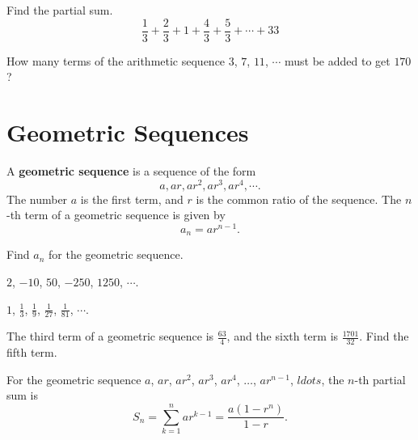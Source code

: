 \begin{exercise}
    Find the partial sum.
    \[\frac13+\frac23+1+\frac43+\frac53+\cdots+33\]
\end{exercise}

\begin{exercise}
  How many terms of the arithmetic sequence $3$, $7$, $11$, $\cdots$ must be added to get $170$?
\end{exercise}

\newpage

\section{Geometric Sequences}

\begin{definition}
A \textbf{geometric sequence} is a sequence of the form
\[a, ar, ar^2, ar^3, ar^4, \cdots.\]
The number $a$ is the first term, and $r$ is the common ratio of the sequence.
The $n$-th term of a geometric sequence is given by
\[a_n=ar^{n-1}.\]
\end{definition}

\begin{example}
    Find $a_n$ for the geometric sequence.\\
    \begin{enumerate*}
        \item $2$, $-10$, $50$, $-250$, $1250$, $\cdots$.
        \item $1$, $\frac{1}{3}$, $\frac{1}{9}$, $\frac{1}{27}$, $\frac{1}{81}$, $\cdots$.\hfill\null
    \end{enumerate*}
\end{example}

\begin{example}
    The third term of a geometric sequence is $\frac{63}{4}$, and the sixth term is $\frac{1701}{32}$. Find the fifth term.
\end{example}

\newpage
\begin{theorem}
    For the geometric sequence $a$, $a r$, $a r^2$, $a r^3$, $a r^4$, $\dots$, $a r^{n-1}$, $ldots$, the $n$-th partial sum is
$$
S_n=\sum_{k=1}^n a r^{k-1}=\dfrac{a(1-r^n)}{1-r}.
$$
\end{theorem}

